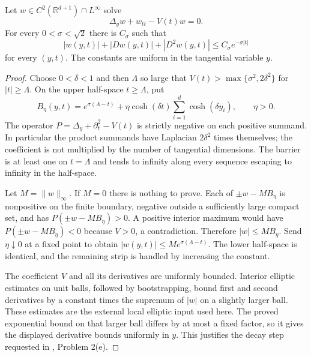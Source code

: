\begin{lemma}\label{lem:phase-bounded-kernel-normal-decay}
Let $w\in C^2(\mathbb R^{d+1})\cap L^\infty$ solve
\[
 \Delta_yw+w_{tt}-V(t)w=0.
\]
For every $0<\sigma<\sqrt2$ there is $C_\sigma$ such that
\[
 |w(y,t)|+|Dw(y,t)|+|D^2w(y,t)|
 \leq C_\sigma e^{-\sigma|t|}
\]
for every $(y,t)$. The constants are uniform in the tangential variable $y$.
\end{lemma}
\begin{proof}
Choose $0<\delta<1$ and then $\Lambda$ so large that $V(t)>\max\{\sigma^2,2\delta^2\}$ for $|t|\geq\Lambda$. On the upper half-space $t\geq\Lambda$, put
\[
 B_\eta(y,t)=e^{\sigma(\Lambda-t)}+
 \eta\cosh(\delta t)\sum_{i=1}^d\cosh(\delta y_i),\qquad \eta>0.
\]
The operator $P=\Delta_y+\partial_t^2-V(t)$ is strictly negative on each positive summand. In particular the product summands have Laplacian $2\delta^2$ times themselves; the coefficient is not multiplied by the number of tangential dimensions. The barrier is at least one on $t=\Lambda$ and tends to infinity along every sequence escaping to infinity in the half-space.

Let $M=\|w\|_\infty$. If $M=0$ there is nothing to prove. Each of $\pm w-MB_\eta$ is nonpositive on the finite boundary, negative outside a sufficiently large compact set, and has $P(\pm w-MB_\eta)>0$. A positive interior maximum would have $P(\pm w-MB_\eta)<0$ because $V>0$, a contradiction. Therefore $|w|\leq MB_\eta$. Send $\eta\downarrow0$ at a fixed point to obtain $|w(y,t)|\leq Me^{\sigma(\Lambda-t)}$. The lower half-space is identical, and the remaining strip is handled by increasing the constant.

The coefficient $V$ and all its derivatives are uniformly bounded. Interior elliptic estimates on unit balls, followed by bootstrapping, bound first and second derivatives by a constant times the supremum of $|w|$ on a slightly larger ball. These estimates are the external local elliptic input used here. The proved exponential bound on that larger ball differs by at most a fixed factor, so it gives the displayed derivative bounds uniformly in $y$. This justifies the decay step requested in \cite{ChAC}, Problem 2(e).
\end{proof}

